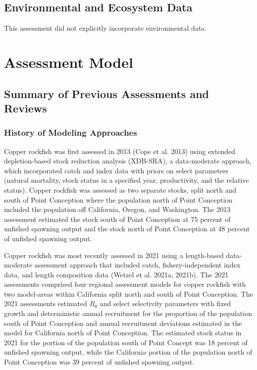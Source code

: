 \documentclass[11pt,
  english,
  letterpaper,
]{article}
\begin{document}
\hypertarget{environmental-and-ecosystem-data}{%
\subsection{Environmental and Ecosystem Data}\label{environmental-and-ecosystem-data}}

This assessment did not explicitly incorporate environmental data.

\hypertarget{assessment-model}{%
\section{Assessment Model}\label{assessment-model}}

\hypertarget{summary-of-previous-assessments-and-reviews}{%
\subsection{Summary of Previous Assessments and Reviews}\label{summary-of-previous-assessments-and-reviews}}

\hypertarget{history-of-modeling-approaches}{%
\subsubsection{History of Modeling Approaches}\label{history-of-modeling-approaches}}

Copper rockfish was first assessed in 2013 (Cope et al. 2013) using extended depletion-based stock reduction analysis (XDB-SRA), a data-moderate approach, which incorporated catch and index data with priors on select parameters (natural mortality, stock status in a specified year, productivity, and the relative status). Copper rockfish was assessed as two separate stocks, split north and south of Point Conception where the population north of Point Conception included the population off California, Oregon, and Washington. The 2013 assessment estimated the stock south of Point Conception at 75 percent of unfished spawning output and the stock north of Point Conception at 48 percent of unfished spawning output.

Copper rockfish was most recently assessed in 2021 using a length-based data-moderate assessment approach that included catch, fishery-independent index data, and length composition data (Wetzel et al. 2021a, 2021b). The 2021 assessments comprised four regional assessment models for copper rockfish with two model-areas within California split north and south of Point Conception. The 2021 assessments estimated \(R_0\) and select selectivity parameters with fixed growth and deterministic annual recruitment for the proportion of the population south of Point Conception and annual recruitment deviations estimated in the model for California north of Point Conception. The estimated stock status in 2021 for the portion of the population south of Point Concept was 18 percent of unfished spawning output, while the California portion of the population north of Point Conception was 39 percent of unfished spawning output.
\end{document}
